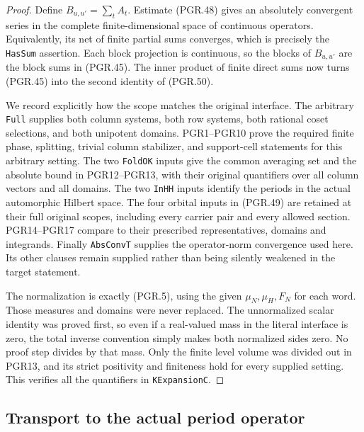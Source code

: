 \begin{proof}
Define \(B_{u,u'}=\sum_tA_t\).  Estimate (PGR.48) gives an
absolutely convergent series in the complete finite-dimensional
space of continuous operators.  Equivalently, its net of finite
partial sums converges, which is precisely the \texttt{HasSum}
assertion.  Each block projection is continuous, so the blocks of
\(B_{u,u'}\) are the block sums in (PGR.45).  The inner product
of finite direct sums now turns (PGR.45) into the second identity
of (PGR.50).

We record explicitly how the scope matches the original interface.
The arbitrary \texttt{Full} supplies both column systems, both
row systems, both rational coset selections, and both unipotent
domains.  PGR1--PGR10 prove the required finite phase, splitting,
trivial column stabilizer, and support-cell statements for this
arbitrary setting.  The two \texttt{FoldOK} inputs give the common
averaging set and the absolute bound in PGR12--PGR13, with their
original quantifiers over all column vectors and all domains.
The two \texttt{InHH} inputs identify the periods in the actual
automorphic Hilbert space.  The four orbital inputs in (PGR.49)
are retained at their full original scopes, including every
carrier pair and every allowed section.  PGR14--PGR17 compare to
their prescribed representatives, domains and integrands.
Finally \texttt{AbsConvT} supplies the operator-norm convergence
used here.  Its other clauses remain supplied rather than being
silently weakened in the target statement.

The normalization is exactly (PGR.5), using the given
\(\mu_N,\mu_H,F_N\) for each word.  Those measures and
domains were never replaced.  The unnormalized scalar identity
was proved first, so even if a real-valued mass in the literal
interface is zero, the total inverse convention simply makes both
normalized sides zero.  No proof step divides by that mass.
Only the finite level volume was divided out in PGR13, and its
strict positivity and finiteness hold for every supplied setting.
This verifies all the quantifiers in \texttt{KExpansionC}.
\end{proof}

\subsection{Transport to the actual period operator}


